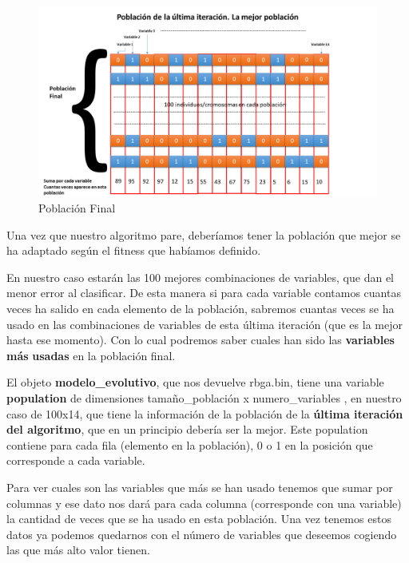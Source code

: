 \documentclass[
  a4paper,
  DIV=11,
  numbers=noendperiod]{scrreprt}
\begin{document}
\begin{figure}

{\centering \includegraphics{imagenes/capitulo3/poblacion_final.png}

}

\caption{\label{fig-poblacion_final}Población Final}

\end{figure}

Una vez que nuestro algoritmo pare, deberíamos tener la población que
mejor se ha adaptado según el fitness que habíamos definido.

En nuestro caso estarán las 100 mejores combinaciones de variables, que
dan el menor error al clasificar. De esta manera si para cada variable
contamos cuantas veces ha salido en cada elemento de la población,
sabremos cuantas veces se ha usado en las combinaciones de variables de
esta última iteración (que es la mejor hasta ese momento). Con lo cual
podremos saber cuales han sido las \textbf{variables} \textbf{más}
\textbf{usadas} en la población final.

El objeto \textbf{modelo\_evolutivo}, que nos devuelve rbga.bin, tiene
una variable \textbf{population} de dimensiones tamaño\_población x
numero\_variables , en nuestro caso de 100x14, que tiene la información
de la población de la \textbf{última iteración del algoritmo}, que en un
principio debería ser la mejor. Este population contiene para cada fila
(elemento en la población), 0 o 1 en la posición que corresponde a cada
variable.

Para ver cuales son las variables que más se han usado tenemos que sumar
por columnas y ese dato nos dará para cada columna (corresponde con una
variable) la cantidad de veces que se ha usado en esta población. Una
vez tenemos estos datos ya podemos quedarnos con el número de variables
que deseemos cogiendo las que más alto valor tienen.
\end{document}
